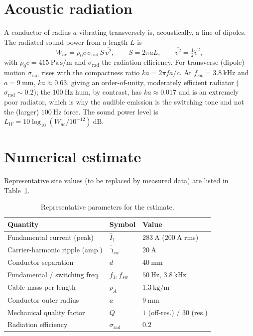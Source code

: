 \documentclass[11pt,a4paper,oneside]{book}
\begin{document}
\begin{onehalfspace}
\begin{appendices}
\section{Acoustic radiation}\label{sec:acou}
A conductor of radius $a$ vibrating transversely is, acoustically, a line of
dipoles. The radiated sound power from a length $L$ is
\begin{equation}
	W_{ac}=\rho_0 c\,\sigma_{\text{rad}}\,S\,\overline{v^2},
	\qquad S=2\pi a L,\qquad \overline{v^2}=\tfrac12\hat v^2,
	\label{eq:Wac}
\end{equation}
with $\rho_0 c=415\ \mathrm{Pa\,s/m}$ and $\sigma_{\text{rad}}$ the radiation
efficiency. For transverse (dipole) motion $\sigma_{\text{rad}}$ rises with the
compactness ratio $ka=2\pi f a/c$. At $f_{sw}=3.8\ \mathrm{kHz}$ and
$a=9\ \mathrm{mm}$, $ka\approx0.63$, giving an order-of-unity, moderately efficient
radiator ($\sigma_{\text{rad}}\sim0.2$); the $100\ \mathrm{Hz}$ hum, by contrast,
has $ka\approx0.017$ and is an extremely poor radiator, which is why the audible
emission is the switching tone and not the (larger) $100\ \mathrm{Hz}$ force. The
sound power level is $L_W=10\log_{10}(W_{ac}/10^{-12})\ \mathrm{dB}$.

\section{Numerical estimate}\label{}
Representative site values (to be replaced by measured data) are listed in
Table~\ref{tab:par}.

\begin{table}[h]
	\centering
	\caption{Representative parameters for the estimate.}
	\label{tab:par}
	\begin{tabular}{@{}lll@{}}
		\toprule
		Quantity & Symbol & Value \\
		\midrule
		Fundamental current (peak) & $\hat I_1$ & $283\ \mathrm{A}$ ($200\ \mathrm{A}$ rms) \\
		Carrier-harmonic ripple (amp.) & $\hat{\tilde\imath}_{sw}$ & $20\ \mathrm{A}$ \\
		Conductor separation & $d$ & $40\ \mathrm{mm}$ \\
		Fundamental / switching freq. & $f_1,f_{sw}$ & $50\ \mathrm{Hz}$, $3.8\ \mathrm{kHz}$ \\
		Cable mass per length & $\rho_A$ & $1.3\ \mathrm{kg/m}$ \\
		Conductor outer radius & $a$ & $9\ \mathrm{mm}$ \\
		Mechanical quality factor & $Q$ & $1$ (off-res.) / $30$ (res.) \\
		Radiation efficiency & $\sigma_{\text{rad}}$ & $0.2$ \\
		\bottomrule
	\end{tabular}
\end{table}


\end{appendices}
\end{onehalfspace}
\end{document}
